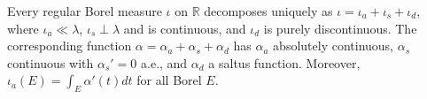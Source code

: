 Every regular Borel measure $\iota$ on $\mathbb{R}$ decomposes uniquely as $\iota = \iota_a + \iota_s + \iota_d$, where $\iota_a \ll \lambda$, $\iota_s \perp \lambda$ and is continuous, and $\iota_d$ is purely discontinuous. The corresponding function $\alpha = \alpha_a + \alpha_s + \alpha_d$ has $\alpha_a$ absolutely continuous, $\alpha_s$ continuous with $\alpha_s'=0$ a.e., and $\alpha_d$ a saltus function. Moreover, $\iota_a(E) = \int_E \alpha'(t) dt$ for all Borel $E$.
